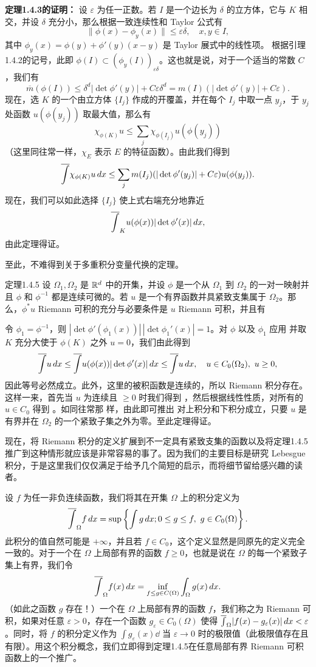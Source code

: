 \textbf{定理1.4.3的证明：} 设 $\varepsilon$ 为任一正数。若 $I$ 是一个边长为 $\delta$ 的立方体，它与 $K$ 相交，并设 $\delta$ 充分小，那么根据一致连续性和 Taylor 公式有
\[\|\phi(x)-\phi_y(x)\|\le\varepsilon\delta,\quad x,y\in I,\]
其中 $\phi_y(x)=\phi(y)+\phi'(y)(x-y)$ 是 Taylor 展式中的线性项。
根据引理1.4.2的记号，此即 $\phi(I)\subset(\phi_y(I))_{\varepsilon\delta}$。这也就是说，对于一个适当的常数 $C$，我们有
\[\overline m(\phi(I))\le\delta^d|\det\phi'(y)|+C\varepsilon\delta^d=m(I)(|\det\phi'(y)|+C\varepsilon).\]
现在，选 $K$ 的一个由立方体 $\{I_j\}$ 作成的开覆盖，并在每个 $I_j$ 中取一点 $y_j$，于 $y_j$ 处函数 $u(\phi(y_j))$ 取最大值，那么有
\[\chi_{\phi(K)}u\le\sum_j\chi_{\phi(I_j)}u(\phi(y_j))\]
（这里同往常一样，$\chi_E$ 表示 $E$ 的特征函数）。由此我们得到
\[\overline{\int}\chi_{\phi(K)}u\,dx\le\sum_jm(I_j)(|\det\phi'(y_j)|+C\varepsilon)u(\phi(y_j)).\]
现在，我们可以如此选择 $\{I_j\}$ 使上式右端充分地靠近
\[\overline{\int}_K u(\phi(x))|\det\phi'(x)|\,dx,\]
由此定理得证。

至此，不难得到关于多重积分变量代换的定理。
\begin{statement}{定理}{1.4.5}
设 $\Omega_1,\Omega_2$ 是 $\mathbb R^d$ 中的开集，并设 $\phi$ 是一个从 $\Omega_1$ 到 $\Omega_2$ 的一对一映射并且 $\phi$ 和 $\phi^{-1}$ 都是连续可微的。若 $u$ 是一个有界函数并具紧致支集属于 $\Omega_2$。那么，$\phi^*u$ Riemann 可积的充分与必要条件是 $u$ Riemann 可积，并且有
\end{statement}
\Proof 令 $\phi_1=\phi^{-1}$，则 $|\det\phi'(\phi_1(x))|\,|\det\phi_1'(x)|=1$。对 $\phi$ 以及 $\phi_1$ 应用  并取 $K$ 充分大使于 $\phi(K)$ 之外 $u=0$，我们由此得到
\[\uint u\dd\le\uint u(\phi(x))|\det\phi'(x)|\dd\le\uint u\dd,\quad u\in C_0(\Omega_2),\ u\ge0,\]
因此等号必然成立。此外，这里的被积函数是连续的，所以 Riemann 积分存在。这样一来，首先当 $u$ 为连续且 $\ge0$ 时我们得到 ，然后根据线性性质，对所有的 $u\in C_0$ 得到 。如同往常那
样，由此即可推出  对上积分和下积分成立，只要 $u$ 是有界并在 $\Omega_2$ 的一个紧致子集之外为零。至此定理得证。

现在，将 Riemann 积分的定义扩展到不一定具有紧致支集的函数以及将定理1.4.5推广到这种情形就应该是非常容易的事了。因为我们的主要目标是研究 Lebesgue 积分，于是这里我们仅仅满足于给予几个简短的启示，而将细节留给感兴趣的读者。

设 $f$ 为任一非负连续函数，我们将其在开集 $\Omega$ 上的积分定义为
\[\overline{\int}_\Omega f\,dx=\sup\left\{\int g\,dx;0\le g\le f,\ g\in C_0(\Omega)\right\}.\]
此积分的值自然可能是 $+\infty$，并且若 $f\in C_0$，这个定义显然是同原先的定义完全一致的。对于一个在 $\Omega$ 上局部有界的函数 $f\ge0$，也就是说在 $\Omega$ 的每一个紧致子集上有界，我们令
\[\overline{\int}_\Omega f(x)\,dx=\inf_{f\le g\in C(\Omega)}\int_\Omega g(x)\,dx.\]
（如此之函数 $g$ 存在！）一个在 $\Omega$ 上局部有界的函数 $f$，我们称之为 Riemann 可积，如果对任意 $\varepsilon>0$，存在一个函数 $g_\varepsilon\in C_0(\Omega)$ 使得 $\overline{\int}_\Omega|f(x)-g_\varepsilon(x)|\,dx<\varepsilon$。同时，将 $f$ 的积分定义作为 $\int g_\varepsilon(x)\dd$ 当 $\varepsilon\to0$ 时的极限值（此极限值存在且有限）。用这个积分概念，我们立即得到定理1.4.5在任意局部有界 Riemann 可积函数上的一个推广。
